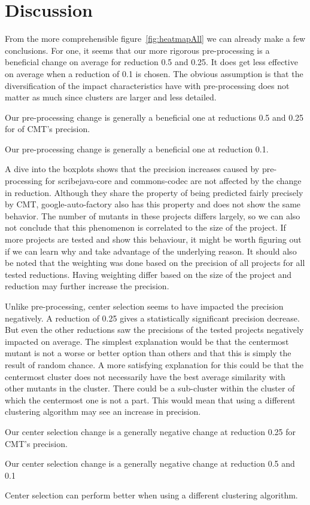 \documentclass[twoside]{uva-inf-bachelor-thesis}
\begin{document}
\section{Discussion}
From the more comprehensible figure~\ref{fig:heatmapAll} we can already make a few conclusions. For one, it seems that our more rigorous pre-processing is a beneficial change on average for reduction 0.5 and 0.25. It does get less effective on average when a reduction of 0.1 is chosen. The obvious assumption is that the diversification of the impact characteristics have with pre-processing does not matter as much since clusters are larger and less detailed.
\begin{finding}
    Our pre-processing change is generally a beneficial one at reductions 0.5 and 0.25 for of CMT's precision.
\end{finding}
\begin{hypothesis}
    Our pre-processing change is generally a beneficial one at reduction 0.1.
\end{hypothesis}
A dive into the boxplots shows that the precision increases caused by pre-processing for scribejava-core and commons-codec are not affected by the change in reduction. Although they share the property of being predicted fairly precisely by CMT, google-auto-factory also has this property and does not show the same behavior. The number of mutants in these projects differs largely, so we can also not conclude that this phenomenon is correlated to the size of the project. If more projects are tested and show this behaviour, it might be worth figuring out if we can learn why and take advantage of the underlying reason. It should also be noted that the weighting was done based on the precision of all projects for all tested reductions. Having weighting differ based on the size of the project and reduction may further increase the precision.


Unlike pre-processing, center selection seems to have impacted the precision negatively. A reduction of 0.25 gives a statistically significant precision decrease. But even the other reductions saw the precisions of the tested projects negatively impacted on average. The simplest explanation would be that the centermost mutant is not a worse or better option than others and that this is simply the result of random chance. A more satisfying explanation for this could be that the centermost cluster does not necessarily have the best average similarity with other mutants in the cluster. There could be a sub-cluster within the cluster of which the centermost one is not a part. This would mean that using a different clustering algorithm may see an increase in precision.
\begin{finding}
    Our center selection change is a generally negative change at reduction 0.25 for CMT's precision.
\end{finding}
\begin{hypothesis}
    Our center selection change is a generally negative change at reduction 0.5 and 0.1
\end{hypothesis}
\begin{hypothesis}
    Center selection can perform better when using a different clustering algorithm.
\end{hypothesis}
\end{document}
